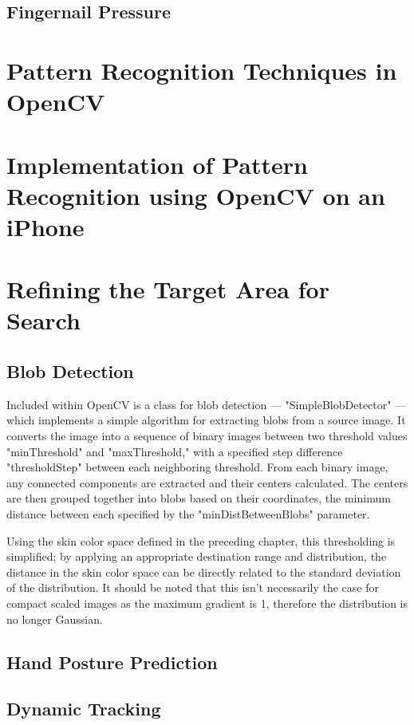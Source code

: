 \subsection{Fingernail Pressure}\label{sec:FingernailPressure}
\section{Pattern Recognition Techniques in OpenCV}\label{sec:PaternRecognitionOpenCV}

\section{Implementation of Pattern Recognition using OpenCV on an iPhone}\label{sec:ImplementationOnIPhone}

\section{Refining the Target Area for Search}\label{sec:RefiningTargetAreaForSearch}

\subsection{Blob Detection}\label{sec:BlobDetection}
Included within OpenCV is a class for blob detection --- "SimpleBlobDetector" --- which implements a simple algorithm for extracting blobs from a source image. It converts the image into a sequence of binary images between two threshold values "minThreshold" and "maxThreshold," with a specified step difference "thresholdStep" between each neighboring threshold. From each binary image, any connected components are extracted and their centers calculated. The centers are then grouped together into blobs based on their coordinates, the minimum distance between each specified by the "minDistBetweenBlobs" parameter.

Using the skin color space defined in the preceding chapter, this thresholding is simplified; by applying an appropriate destination range and distribution, the distance in the skin color space can be directly related to the standard deviation of the distribution. It should be noted that this isn't necessarily the case for compact scaled images as the maximum gradient is 1, therefore the distribution is no longer Gaussian.

\subsection{Hand Posture Prediction}\label{sec:HandPosturePrediction}
\subsection{Dynamic Tracking}\label{sec:DynamicTracking}
